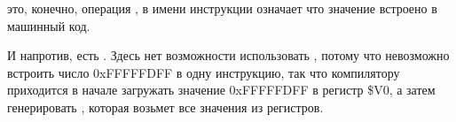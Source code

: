 ﻿



 это, конечно, операция ,  в имени инструкции означает что значение встроено в машинный код.

И напротив, есть \AND. Здесь нет возможности использовать , потому что невозможно встроить число 
0xFFFFFDFF в одну инструкцию, так что компилятору приходится в начале загружать значение 0xFFFFFDFF в регистр \$V0,
а затем генерировать \AND, которая возьмет все значения из регистров.

